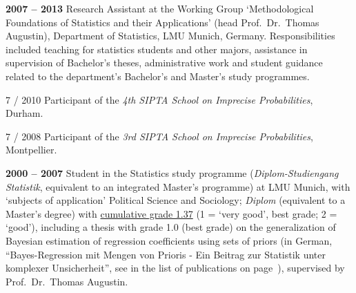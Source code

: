 \documentclass[a4paper]{simplecv}
\begin{document}
\begin{topic}
\item[\hspace*{-2ex}\bfseries 2007 -- 2013] Research Assistant at the Working Group `Methodological Foundations of Statistics and their Applications'
                    (head Prof.\ Dr.\ Thomas Augustin),
                    Department of Statistics, LMU Munich, Germany.
                    Responsibilities included teaching for statistics students and other majors, %
                    assistance in supervision of Bachelor's theses,
                    administrative work and student guidance related to the department's Bachelor's and Master's study programmes.

\item[7 / 2010] Participant of the \emph{4th SIPTA School on Imprecise Probabilities}, Durham. %

\item[7 / 2008] Participant of the \emph{3rd SIPTA School on Imprecise Probabilities}, Montpellier. %

\item[\hspace*{-2ex}\bfseries 2000 -- 2007] Student in the Statistics study programme %
(\emph{Di\-plom-Studiengang Statistik}, equivalent to an integrated Master's programme) %
at LMU Munich,
with `subjects of application' Political Science and Sociology;
%
\emph{Diplom} (equivalent to a Master's degree) with \href{http://www.geeero.de/files/diplom.pdf}{cumulative grade 1.37}
(1 = `very good', best grade; 2 = `good'), including a thesis
with grade 1.0 (best grade) %
on the generalization of Bayesian estimation of regression coefficients using sets of priors
(in German, ``Bayes-Regression mit Mengen von Prioris - Ein Beitrag zur Statistik unter komplexer Unsicherheit'',
see \cite{Walter2006a} in the list of publications on page~\pageref{publications}),
supervised by Prof.\ Dr.\ Thomas Augustin.


\end{topic}
\end{document}
